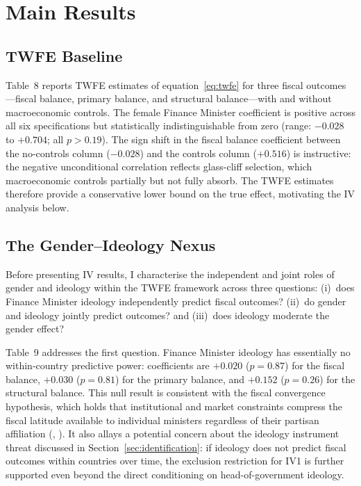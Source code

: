 \documentclass[12pt]{article}
\renewcommand{\citep}[1]{(\textit{\citeauthor{#1}}, \citeyear{#1})}
\begin{document}
\section{Main Results}
\label{sec:results}

\subsection{TWFE Baseline}

Table~8 reports TWFE estimates of equation~\eqref{eq:twfe} for three fiscal 
outcomes---fiscal balance, primary balance, and structural balance---with and 
without macroeconomic controls. The female Finance Minister coefficient is 
positive across all six specifications but statistically indistinguishable from 
zero (range: $-0.028$ to $+0.704$; all $p > 0.19$). The sign shift in the 
fiscal balance coefficient between the no-controls column ($-0.028$) and the 
controls column ($+0.516$) is instructive: the negative unconditional 
correlation reflects glass-cliff selection, which macroeconomic controls 
partially but not fully absorb. The TWFE estimates therefore provide a 
conservative lower bound on the true effect, motivating the IV analysis below.


\subsection{The Gender--Ideology Nexus}

Before presenting IV results, I characterise the independent and joint roles 
of gender and ideology within the TWFE framework across three questions: 
(i)~does Finance Minister ideology independently predict fiscal outcomes? 
(ii)~do gender and ideology jointly predict outcomes? and (iii)~does ideology 
moderate the gender effect?

Table~9 addresses the first question. Finance Minister ideology has essentially 
no within-country predictive power: coefficients are $+0.020$ ($p = 0.87$) 
for the fiscal balance, $+0.030$ ($p = 0.81$) for the primary balance, and 
$+0.152$ ($p = 0.26$) for the structural balance. This null result is 
consistent with the fiscal convergence hypothesis, which holds that 
institutional and market constraints compress the fiscal latitude available to 
individual ministers regardless of their partisan affiliation 
\citep{alesina1997,garrett1998}. It also allays a potential concern about the 
ideology instrument threat discussed in Section~\ref{sec:identification}: if 
ideology does not predict fiscal outcomes within countries over time, the 
exclusion restriction for IV1 is further supported even beyond the direct 
conditioning on head-of-government ideology.
\end{document}
